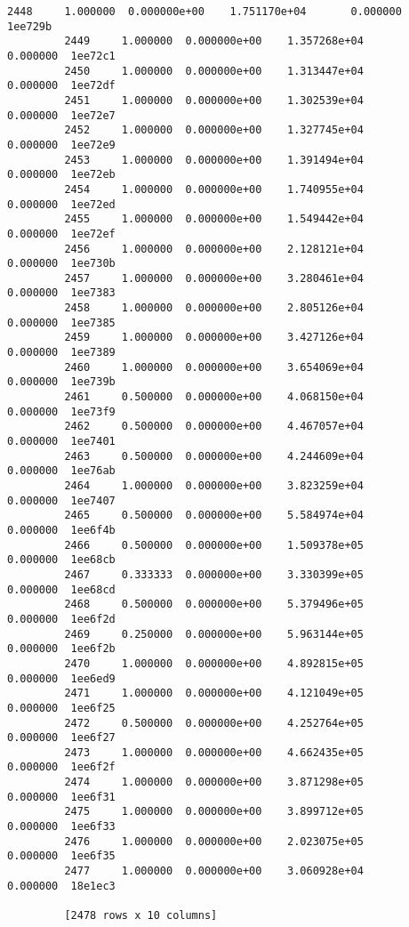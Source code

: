 \documentclass[11pt]{article}
\begin{document}
\begin{Verbatim}[commandchars=\\\{\}]
         2448     1.000000  0.000000e+00    1.751170e+04       0.000000  1ee729b  
         2449     1.000000  0.000000e+00    1.357268e+04       0.000000  1ee72c1  
         2450     1.000000  0.000000e+00    1.313447e+04       0.000000  1ee72df  
         2451     1.000000  0.000000e+00    1.302539e+04       0.000000  1ee72e7  
         2452     1.000000  0.000000e+00    1.327745e+04       0.000000  1ee72e9  
         2453     1.000000  0.000000e+00    1.391494e+04       0.000000  1ee72eb  
         2454     1.000000  0.000000e+00    1.740955e+04       0.000000  1ee72ed  
         2455     1.000000  0.000000e+00    1.549442e+04       0.000000  1ee72ef  
         2456     1.000000  0.000000e+00    2.128121e+04       0.000000  1ee730b  
         2457     1.000000  0.000000e+00    3.280461e+04       0.000000  1ee7383  
         2458     1.000000  0.000000e+00    2.805126e+04       0.000000  1ee7385  
         2459     1.000000  0.000000e+00    3.427126e+04       0.000000  1ee7389  
         2460     1.000000  0.000000e+00    3.654069e+04       0.000000  1ee739b  
         2461     0.500000  0.000000e+00    4.068150e+04       0.000000  1ee73f9  
         2462     0.500000  0.000000e+00    4.467057e+04       0.000000  1ee7401  
         2463     0.500000  0.000000e+00    4.244609e+04       0.000000  1ee76ab  
         2464     1.000000  0.000000e+00    3.823259e+04       0.000000  1ee7407  
         2465     0.500000  0.000000e+00    5.584974e+04       0.000000  1ee6f4b  
         2466     0.500000  0.000000e+00    1.509378e+05       0.000000  1ee68cb  
         2467     0.333333  0.000000e+00    3.330399e+05       0.000000  1ee68cd  
         2468     0.500000  0.000000e+00    5.379496e+05       0.000000  1ee6f2d  
         2469     0.250000  0.000000e+00    5.963144e+05       0.000000  1ee6f2b  
         2470     1.000000  0.000000e+00    4.892815e+05       0.000000  1ee6ed9  
         2471     1.000000  0.000000e+00    4.121049e+05       0.000000  1ee6f25  
         2472     0.500000  0.000000e+00    4.252764e+05       0.000000  1ee6f27  
         2473     1.000000  0.000000e+00    4.662435e+05       0.000000  1ee6f2f  
         2474     1.000000  0.000000e+00    3.871298e+05       0.000000  1ee6f31  
         2475     1.000000  0.000000e+00    3.899712e+05       0.000000  1ee6f33  
         2476     1.000000  0.000000e+00    2.023075e+05       0.000000  1ee6f35  
         2477     1.000000  0.000000e+00    3.060928e+04       0.000000  18e1ec3  
         
         [2478 rows x 10 columns]
\end{Verbatim}
            
\end{document}
